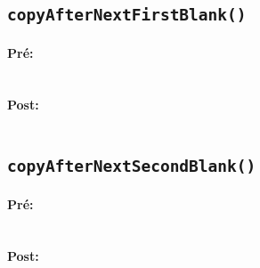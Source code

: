 \documentclass[a4paper,11pt]{article}
\begin{document}
\subsection{\texttt{copyAfterNextFirstBlank()}}
\paragraph{Pré:}
\begin{verbatim}
\end{verbatim}
\paragraph{Post:}
\begin{verbatim}
\end{verbatim}
\subsection{\texttt{copyAfterNextSecondBlank()}}
\paragraph{Pré:}
\begin{verbatim}
\end{verbatim}
\paragraph{Post:}
\begin{verbatim}
\end{verbatim}
\end{document}
